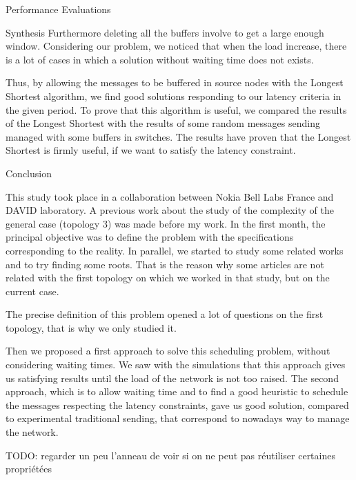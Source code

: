 \documentclass[a4paper,10pt]{report}
\newcommand{\todo}[1]{}
\renewcommand{\todo}[1]{{\color{red} TODO: {#1}}}
\begin{document}
\begin{chapter}{Performance Evaluations}
\begin{section}{Synthesis}
Furthermore deleting all the buffers involve to get a large enough window. Considering our problem, we noticed that when the 
load increase, there is a lot of cases in which a solution without waiting time does not exists.

Thus, by allowing the messages to be buffered in source nodes with the Longest Shortest algorithm, we find good solutions responding to our latency 
criteria in the given period. To prove that this algorithm is useful, we compared the results of the Longest Shortest with the results of some
random messages sending managed with some buffers in switches. The results have proven that the Longest Shortest is firmly useful, if we want
to satisfy the latency constraint.

\end{section}

\end{chapter}



\begin{chapter}{Conclusion}

This study took place in a collaboration between Nokia Bell Labs France and DAVID laboratory.
A previous work about the study of the complexity of the general case (topology 3) was made before my work.
In the first month, the principal objective was to define the problem with the specifications corresponding to the reality.
In parallel, we started to study some related works and to try finding some roots. That is the reason why some articles are not related
with the first topology on which we worked in that study, but on the current case.

The precise definition of this problem opened a lot of questions on the first topology, that is why we only studied it.

Then we proposed a first approach to solve this scheduling problem, without considering waiting times. We saw with the simulations 
that this approach gives us satisfying results until the load of the network is not too raised.
The second approach, which is to allow waiting time and to find a good heuristic to schedule the messages respecting the latency constraints,
gave us good solution, compared to experimental traditional sending, that correspond to nowadays way to manage the network.

\todo{regarder un peu l'anneau de voir si on ne peut pas réutiliser certaines propriétées}


\end{chapter}
\appendix
\end{document}
